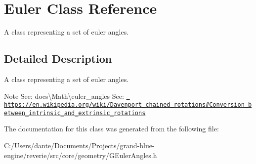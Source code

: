 \hypertarget{class_euler}{}\section{Euler Class Reference}
\label{class_euler}


A class representing a set of euler angles.  




\subsection{Detailed Description}
A class representing a set of euler angles. 

\begin{DoxyNote}{Note}
See\+: docs\textbackslash{}\+Math\textbackslash{}euler\+\_\+angles See\+: \href{https://en.wikipedia.org/wiki/Davenport_chained_rotations\#Conversion_between_intrinsic_and_extrinsic_rotations}{\texttt{ https\+://en.\+wikipedia.\+org/wiki/\+Davenport\+\_\+chained\+\_\+rotations\#\+Conversion\+\_\+between\+\_\+intrinsic\+\_\+and\+\_\+extrinsic\+\_\+rotations}} 
\end{DoxyNote}


The documentation for this class was generated from the following file\+:\begin{DoxyCompactItemize}
\item 
C\+:/\+Users/dante/\+Documents/\+Projects/grand-\/blue-\/engine/reverie/src/core/geometry/G\+Euler\+Angles.\+h\end{DoxyCompactItemize}
